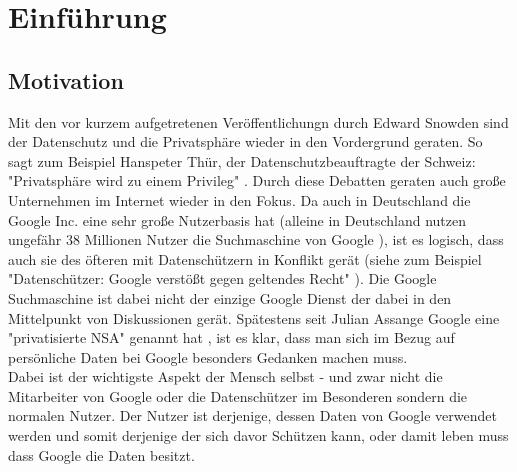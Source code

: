 %
% 

\chapter{Einführung}


\section{Motivation}
Mit den vor kurzem aufgetretenen Veröffentlichungn durch Edward Snowden sind der Datenschutz und die Privatsphäre wieder in den Vordergrund geraten. So sagt zum Beispiel Hanspeter Thür, der Datenschutzbeauftragte der Schweiz: "Privatsphäre wird zu einem Privileg" \cite{nzzdatenschutzprivileg}. Durch diese Debatten geraten auch große Unternehmen im Internet wieder in den Fokus. Da auch in Deutschland die Google Inc. eine sehr große Nutzerbasis hat (alleine in Deutschland nutzen ungefähr 38 Millionen Nutzer die Suchmaschine von Google \cite{statistagoogle}), ist es logisch, dass auch sie des öfteren mit Datenschützern in Konflikt gerät (siehe zum Beispiel "Datenschützer: Google verstößt gegen geltendes Recht" \cite{gulligooglegeltendesrecht}). Die Google Suchmaschine ist dabei nicht der einzige Google Dienst der dabei in den Mittelpunkt von Diskussionen gerät. Spätestens seit Julian Assange Google eine "privatisierte NSA" genannt hat \cite{assangegooglensa}, ist es klar, dass man sich im Bezug auf persönliche Daten bei Google besonders Gedanken machen muss.\\
Dabei ist der wichtigste Aspekt der Mensch selbst - und zwar nicht die Mitarbeiter von Google oder die Datenschützer im Besonderen sondern die normalen Nutzer. Der Nutzer ist derjenige, dessen Daten von Google verwendet werden und somit derjenige der sich davor Schützen kann, oder damit leben muss dass Google die Daten besitzt.


